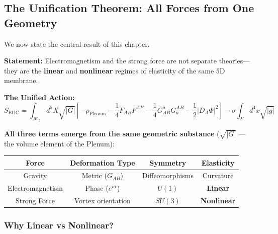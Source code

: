 \subsection{The Unification Theorem: All Forces from One Geometry}
\label{subsec:unification_theorem}

We now state the central result of this chapter.

\begin{tcolorbox}[colback=yellow!10,colframe=orange!80!black,title=\textbf{THEOREM: Geometric Unification of Fundamental Forces}]

\textbf{Statement:} Electromagnetism and the strong force are not separate theories---they are the \textbf{linear} and \textbf{nonlinear} regimes of elasticity of the same 5D membrane.

\vspace{0.5em}

\textbf{The Unified Action:}
\begin{equation}
\boxed{S_{\text{EDC}} = \int_{\mathcal{M}_5} d^5X \sqrt{|G|} \left[ -\rho_{\text{Plenum}} - \frac{1}{4}F_{AB}F^{AB} - \frac{1}{4}G^a_{AB}G_a^{AB} - \frac{1}{2}|D_A\Phi|^2 \right] - \sigma\int_\Sigma d^4x\sqrt{|g|}}
\end{equation}

\textbf{All three terms emerge from the same geometric substance} ($\sqrt{|G|}$ --- the volume element of the Plenum):

\begin{center}
\begin{tabular}{|c|c|c|c|}
\hline
\textbf{Force} & \textbf{Deformation Type} & \textbf{Symmetry} & \textbf{Elasticity} \\
\hline
Gravity & Metric ($G_{AB}$) & Diffeomorphisms & Curvature \\
\hline
Electromagnetism & Phase ($e^{i\alpha}$) & $U(1)$ & \textbf{Linear} \\
\hline
Strong Force & Vortex orientation & $SU(3)$ & \textbf{Nonlinear} \\
\hline
\end{tabular}
\end{center}

\end{tcolorbox}

\subsubsection{Why Linear vs Nonlinear?}

